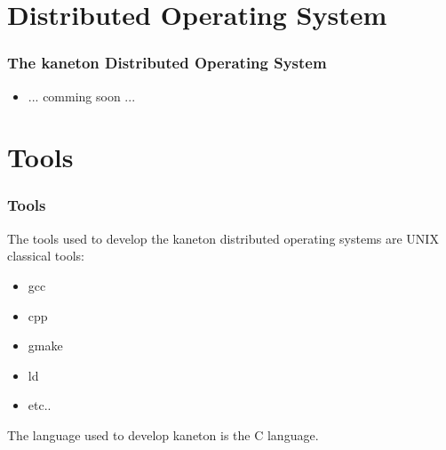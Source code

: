 \documentclass[8pt]{beamer}
\newcommand{\nl}[0]{\vspace{0.4cm}}
\begin{document}
%
%

\section{Distributed Operating System}

\begin{frame}
  \frametitle{The kaneton Distributed Operating System}

  \begin{itemize}[<+->]
    \item ... comming soon ...
  \end{itemize}
\end{frame}

%
%

\section{Tools}


\begin{frame}
  \frametitle{Tools}

  The tools used to develop the kaneton distributed operating systems
  are UNIX classical tools:

  \begin{itemize}
    \item
      gcc
    \item
      cpp
    \item
      gmake
    \item
      ld
    \item
      etc..
  \end{itemize}

  \nl

  The language used to develop kaneton is the C language.
\end{frame}
\end{document}
